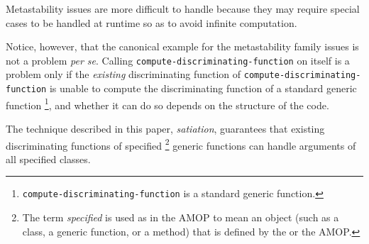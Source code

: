 Metastability issues are more difficult to handle because they may
require special cases to be handled at runtime so as to avoid infinite
computation.  

Notice, however, that the canonical example for the
metastability family issues is not a problem \emph{per se}.  Calling
\texttt{compute-discriminating-function} on itself is a problem only
if the \emph{existing} discriminating function of
\texttt{compute-discriminating-function} is unable to compute the
discriminating function of a standard generic function%
\footnote{\texttt{compute-discriminating-function} is a standard
  generic function.}, and whether it can do so depends on the structure
of the code.

The technique described in this paper, \emph{satiation}, guarantees
that existing discriminating functions of specified%
\footnote{The term \emph{specified} is used as in the AMOP to mean
  an object (such as a class, a generic function, or a method) that is
  defined by the \hs{} or the AMOP.}
generic functions can handle arguments of all specified classes.
